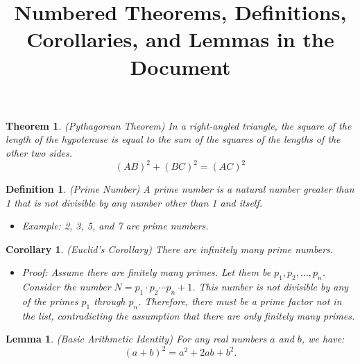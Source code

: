 \documentclass{article}
\newtheorem{theorem}{Theorem}
\newtheorem{definition}{Definition}
\newtheorem{corollary}{Corollary}
\newtheorem{lemma}{Lemma}
\begin{document}
\title{Numbered Theorems, Definitions, Corollaries, and Lemmas in the Document}
\date{}
\maketitle
\begin{theorem}
    (Pythagorean Theorem) In a right-angled triangle, the square of the length of the hypotenuse is equal to the sum of the squares of the lengths of the other two sides. 
    \begin{equation}
    (AB)^2 + (BC)^2 = (AC)^2
    \end{equation}
\end{theorem}
\begin{definition}
    (Prime Number) A prime number is a natural number greater than 1 that is not divisible by any number other than 1 and itself.
    \begin{itemize}
        \item Example: 2, 3, 5, and 7 are prime numbers.
    \end{itemize}
\end{definition}
\begin{corollary}
    (Euclid's Corollary) There are infinitely many prime numbers.
    \begin{itemize}
        \item Proof: Assume there are finitely many primes. Let them be $p_1, p_2, \ldots, p_n$.
        Consider the number $N = p_1 \cdot p_2 \cdots p_n + 1$.
        This number is not divisible by any of the primes $p_1$ through $p_n$.
        Therefore, there must be a prime factor not in the list, contradicting the assumption that there are only finitely many primes.
    \end{itemize}
\end{corollary}
\begin{lemma}
    (Basic Arithmetic Identity) For any real numbers $a$ and $b$, we have:
    \begin{equation}
        (a + b)^2 = a^2 + 2ab + b^2.
    \end{equation}
\end{lemma}
\end{document}
